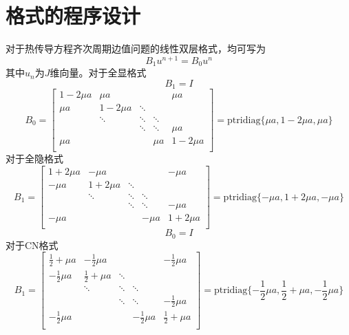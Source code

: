 \documentclass[UTF8,a4paper,10pt]{ctexart}
\begin{document}
\section{格式的程序设计}
\par
对于热传导方程齐次周期边值问题的线性双层格式，均可写为
$$
    B_1 u^{n+1} = B_0 u^n
$$
其中$u_n$为$J$维向量。对于全显格式
$$
    B_1 = I
$$
$$
    B_0 =
    \begin{bmatrix}
        1 - 2 \mu a & \mu a       &        &        & \mu a       \\
        \mu a       & 1 - 2 \mu a & \ddots &        &             \\
                    & \ddots      & \ddots & \ddots &             \\
                    &             & \ddots & \ddots & \mu a       \\
        \mu a       &             &        & \mu a  & 1 - 2 \mu a \\
    \end{bmatrix}
    = \mathrm{ptridiag} \{\mu a, 1 - 2 \mu a, \mu a\}
$$
对于全隐格式
$$
    B_1 =
    \begin{bmatrix}
        1 + 2 \mu a & -\mu a      &        &        & -\mu a      \\
        -\mu a      & 1 + 2 \mu a & \ddots &        &             \\
                    & \ddots      & \ddots & \ddots &             \\
                    &             & \ddots & \ddots & -\mu a      \\
        -\mu a      &             &        & -\mu a & 1 + 2 \mu a \\
    \end{bmatrix}
    = \mathrm{ptridiag} \{-\mu a, 1 + 2 \mu a, -\mu a\}
$$
$$
    B_0 = I
$$
对于CN格式
$$
    B_1 =
    \begin{bmatrix}
        \frac{1}{2} +  \mu a & -\frac{1}{2}\mu a    &        &                   & -\frac{1}{2}\mu a   \\
        -\frac{1}{2}\mu a    & \frac{1}{2} +  \mu a & \ddots &                   &                     \\
                             & \ddots               & \ddots & \ddots            &                     \\
                             &                      & \ddots & \ddots            & -\frac{1}{2}\mu a   \\
        -\frac{1}{2}\mu a    &                      &        & -\frac{1}{2}\mu a & \frac{1}{2} + \mu a \\
    \end{bmatrix}
    = \mathrm{ptridiag} \{-\dfrac{1}{2}\mu a, \dfrac{1}{2} + \mu a, -\dfrac{1}{2}\mu a\}
$$
\end{document}
